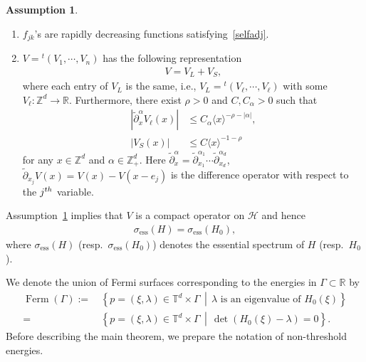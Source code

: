 \documentclass[10pt]{amsart}
\theoremstyle{definition}
\newtheorem{assu}[theo]{Assumption}
\newenvironment{enonce}[1]{\begin{assu}}{\end{assu}}
\numberwithin{equation}{section}
\renewcommand{\a}{\alpha}
\renewcommand{\l}{\lambda}
\newcommand{\x}{\xi}
\newcommand{\R}{\mathbb{R}}
\newcommand{\Z}{\mathbb{Z}}
\newcommand{\T}{\mathbb{T}}
\newcommand{\HS}{\mathcal{H}}
\newcommand{\la}{\langle}
\newcommand{\ra}{\rangle}
\DeclareMathOperator{\Ferm}{Ferm}
\begin{document}
\begin{enonce}{Assumption}\label{ass}\leavevmode
\begin{enumerate}
\item\label{assum1.1.1} $f_{jk}$'s are rapidly decreasing functions satisfying~\eqref{selfadj}.

\item\label{assum1.1.2} $V={}^t(V_1, \cdots, V_n)$ has the following representation
\begin{align*}
V=V_L + V_S,
\end{align*}
where each entry of $V_L$ is the same, i.e., $V_L={}^t(V_\ell, \cdots, V_\ell)$ with some $V_\ell : \Z^d \to \R$. Furthermore, there exist $\rho>0$ and $C,C_\a>0$ such that
\begin{align}
\left|\tilde\partial_x^\a V_\ell(x)\right| &\leq C_\a \la x \ra^{-\rho-|\a|}, \label{long range}
\\
|V_S(x)| &\leq C \la x \ra^{-1-\rho} \label{short range}
\end{align}
for any $x\in\Z^d$ and $\a\in\Z_+^d$. Here $\tilde\partial_x^\a=\tilde\partial_{x_1}^{\a_1} \cdots \tilde\partial_{x_d}^{\a_d}$, $\tilde \partial_{x_j} V(x)=V(x)-V(x-e_j)$ is the difference operator with respect to the $j^{\rm th}$ variable.
\end{enumerate}
\end{enonce}


Assumption~\ref{ass} implies that $V$ is a compact operator on $\HS$ and hence
\begin{align*}
\sigma_{\operatorname{ess}}(H)=\sigma_{\operatorname{ess}}(H_0),
\end{align*}
where $\sigma_{\operatorname{ess}}(H)$ (resp.\ $\sigma_{\operatorname{ess}}(H_0)$) denotes the essential spectrum of $H$ (resp.\ $H_0$).


We denote the union of Fermi surfaces corresponding to the energies in $\Gamma\subset\R$ by
\begin{align*}
\Ferm(\Gamma):=&\,\left\{ p = (\x,\l)\in\T^d\times\Gamma \,\middle|\, \l \text{ is an eigenvalue of }H_0(\x) \right\} \\
=&\, \left\{ p = (\x,\l)\in\T^d\times\Gamma \,\middle|\, \det \left(H_0(\x)-\l\right)=0 \right\}. 
\end{align*}
Before describing the main theorem, we prepare the notation of non-threshold energies.
\end{document}
